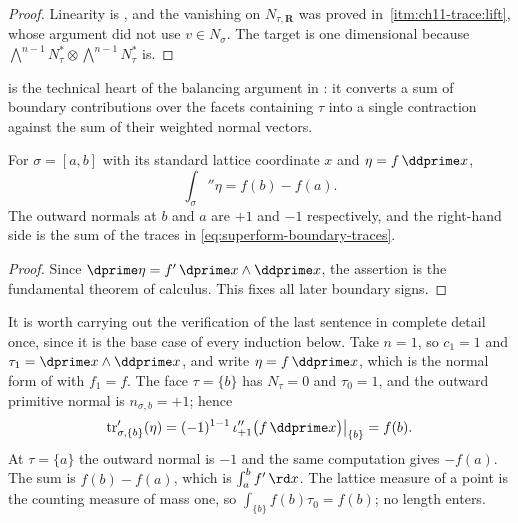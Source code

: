 \begin{proof}
Linearity is , and the vanishing on
$N_{\tau,\mathbf R}$ was proved in
\,\cref{itm:ch11-trace:lift}, whose
argument did not use $v\in N_\sigma$.  The target is one dimensional because
$\bigwedge^{n-1}N_\tau^*\otimes\bigwedge^{n-1}N_\tau^*$ is.
\end{proof}

 is the technical heart of the balancing
argument in : it converts a sum of boundary
contributions over the facets containing $\tau$ into a single contraction
against the sum of their weighted normal vectors.

\begin{lemma}
\label{lem:ch11-segment-stokes}
For $\sigma=[a,b]$ with its standard lattice coordinate $x$ and
$\eta=f\,\ddprime x$,
\[
                       \int_\sigma \dprime\eta=f(b)-f(a).
\]
The outward normals at $b$ and $a$ are $+1$ and $-1$ respectively, and the
right-hand side is the sum of the traces in
\eqref{eq:superform-boundary-traces}.
\end{lemma}
\begin{proof}
Since $\dprime\eta=f'\,\dprime x\wedge \ddprime x$, the assertion is the fundamental theorem
of calculus. This fixes all later boundary signs.
\end{proof}

It is worth carrying out the verification of the last sentence in complete
detail once, since it is the base case of every induction below.  Take
$n=1$, so $c_1=1$ and $\tau_1=\dprime x\wedge\ddprime x$, and write
$\eta=f\,\ddprime x$, which is the normal form of
 with $f_1=f$.  The face $\tau=\{b\}$ has
$N_\tau=0$ and $\tau_0=1$, and the outward primitive normal is
$n_{\sigma,b}=+1$; hence
\[
 \operatorname{tr}'_{\sigma,\{b\}}(\eta)
 =(-1)^{1-1}\,\iota''_{+1}\bigl(f\,\ddprime x\bigr)\big|_{\{b\}}
 =f(b).
\]
At $\tau=\{a\}$ the outward normal is $-1$ and the same computation gives
$-f(a)$.  The sum is $f(b)-f(a)$, which is $\int_a^bf'\,\rd x$.  The
lattice measure of a point is the counting measure of mass one, so
$\int_{\{b\}}f(b)\tau_0=f(b)$; no length enters.


